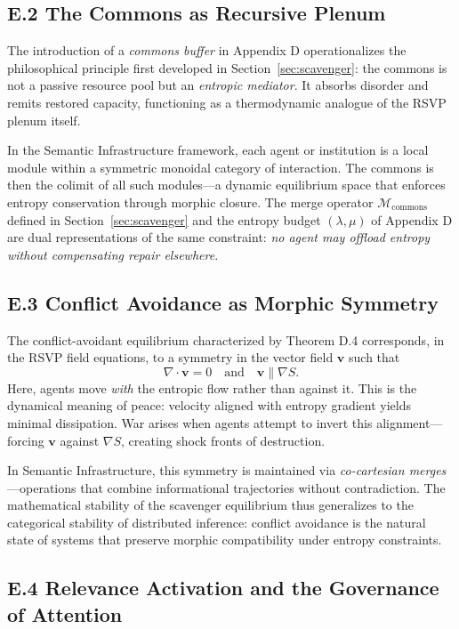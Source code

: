 \documentclass[11pt,a4paper,titlepage]{article}
\theoremstyle{definition}
\begin{document}
\subsection*{E.2 The Commons as Recursive Plenum}

The introduction of a \emph{commons buffer} in Appendix D operationalizes the philosophical principle
first developed in Section~\ref{sec:scavenger}: the commons is not a passive resource pool 
but an \emph{entropic mediator}.  
It absorbs disorder and remits restored capacity, functioning as a 
thermodynamic analogue of the RSVP plenum itself.

In the Semantic Infrastructure framework, each agent or institution is a local module 
within a symmetric monoidal category of interaction.  
The commons is then the colimit of all such modules—a dynamic equilibrium space 
that enforces entropy conservation through morphic closure.  
The merge operator $\mathcal{M}_{\text{commons}}$ defined in Section~\ref{sec:scavenger}
and the entropy budget $(\lambda,\mu)$ of Appendix D 
are dual representations of the same constraint: 
\emph{no agent may offload entropy without compensating repair elsewhere.}

\subsection*{E.3 Conflict Avoidance as Morphic Symmetry}

The conflict-avoidant equilibrium characterized by Theorem D.4 
corresponds, in the RSVP field equations, to a symmetry in the 
vector field $\mathbf{v}$ such that 
\[
\nabla\!\cdot\!\mathbf{v} = 0 \quad\text{and}\quad 
\mathbf{v}\parallel\nabla S.
\]
Here, agents move \emph{with} the entropic flow rather than against it.
This is the dynamical meaning of peace: 
velocity aligned with entropy gradient yields minimal dissipation.
War arises when agents attempt to invert this alignment—forcing $\mathbf{v}$ against $\nabla S$,
creating shock fronts of destruction.

In Semantic Infrastructure, this symmetry is maintained via 
\emph{co-cartesian merges}—operations that combine informational trajectories 
without contradiction.  
The mathematical stability of the scavenger equilibrium 
thus generalizes to the categorical stability of distributed inference: 
conflict avoidance is the natural state of systems 
that preserve morphic compatibility under entropy constraints.

\subsection*{E.4 Relevance Activation and the Governance of Attention}
\end{document}
